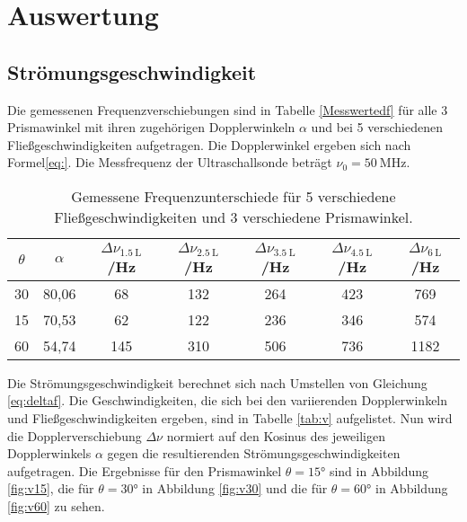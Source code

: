 \section{Auswertung}
\label{sec:Auswertung}
\subsection{Strömungsgeschwindigkeit}
Die gemessenen Frequenzverschiebungen sind in Tabelle \ref{Messwertedf} für alle 3 Prismawinkel mit ihren zugehörigen 
Dopplerwinkeln $\alpha$ und bei 5 verschiedenen Fließgeschwindigkeiten aufgetragen. Die Dopplerwinkel ergeben sich nach Formel\eqref{eq:}.
Die Messfrequenz der Ultraschallsonde beträgt $\nu_0=\qty{50}{\mega\Hz}$.
\begin{table}[H]
  \centering
  \caption{Gemessene Frequenzunterschiede für 5 verschiedene Fließgeschwindigkeiten und 3 verschiedene Prismawinkel.}
  \label{tab:Messwertedf}
  \begin{tabular}{S[table-format=2] S[table-format=2.2] S[table-format=3] S[table-format=3] S[table-format=3]S[table-format=3]S[table-format=4]}
      \toprule
      {$\theta$}&{$\alpha$}&{$\Delta \nu_{\qty{1.5}{\liter}}$/Hz}&{$\Delta \nu_{\qty{2.5}{\liter}}$/Hz}&{$\Delta \nu_{\qty{3.5}{\liter}}$/Hz}&{$\Delta \nu_{\qty{4.5}{\liter}}$/Hz}&{$\Delta \nu_{\qty{6}{\liter}}$}/Hz\\
       & 80,06 & 68 & 132 & 264 & 423 & 769 \\
      15 & 70,53 & 62 & 122 & 236 & 346 & 574 \\
      60 & 54,74 & 145 & 310 & 506 & 736 & 1182 \\
      \bottomrule
  \end{tabular}
\end{table}
Die Strömungsgeschwindigkeit berechnet sich nach Umstellen von Gleichung \eqref{eq:deltaf}. Die Geschwindigkeiten, die sich 
bei den variierenden Dopplerwinkeln und Fließgeschwindigkeiten ergeben, sind in Tabelle \ref{tab:v} aufgelistet. Nun wird die Dopplerverschiebung $\Delta \nu$
normiert auf den Kosinus des jeweiligen Dopplerwinkels $\alpha$ gegen die resultierenden Strömungsgeschwindigkeiten aufgetragen.
Die Ergebnisse für den Prismawinkel $\theta = 15°$ sind in Abbildung \ref{fig:v15}, die für $\theta = 30°$ in Abbildung \ref{fig:v30} und die für $\theta = 60°$ in Abbildung \ref{fig:v60} zu sehen.
